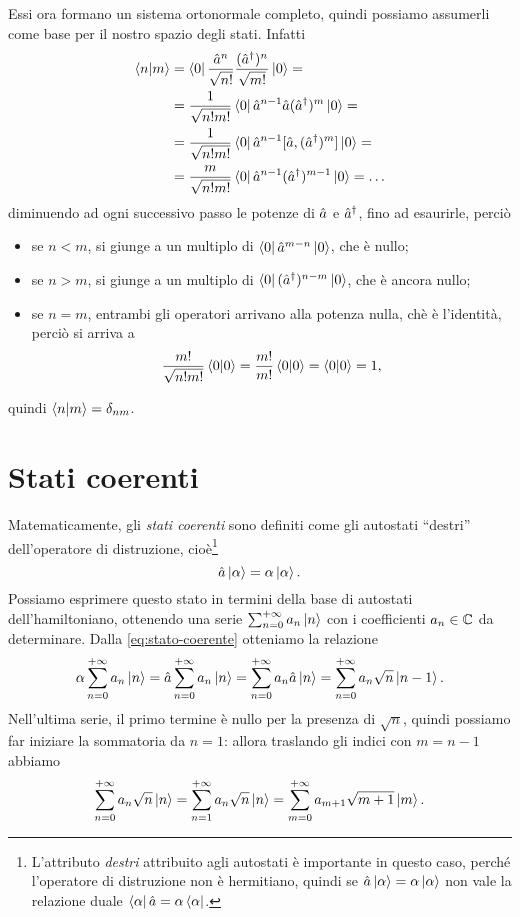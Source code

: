 Essi ora formano un sistema ortonormale completo, quindi possiamo assumerli come base per il nostro spazio degli stati.
Infatti
\begin{equation}
	\begin{split}
		\left\langle{n}\middle|{m}\right\rangle&=\left\langle{0}\right|\frac{\hat{a}^n}{\sqrt{n!}}\frac{({\hat{a}}^\dagger)^n}{\sqrt{m!}}\left|{0}\right\rangle=\\
		&=\frac1{\sqrt{n!m!}}\left\langle{0}\right|\hat{a}^{n-1}\hat{a}({\hat{a}}^\dagger)^m\left|{0}\right\rangle=\\
		&=\frac1{\sqrt{n!m!}}\left\langle{0}\right|\hat{a}^{n-1}[\hat{a},({\hat{a}}^\dagger)^m]\left|{0}\right\rangle=\\
		&=\frac{m}{\sqrt{n!m!}}\left\langle{0}\right|\hat{a}^{n-1}({\hat{a}}^\dagger)^{m-1}\left|{0}\right\rangle=\dots
	\end{split}
	\label{eq:oscillatore-armonico-ortonormalita-autostati}
\end{equation}
diminuendo ad ogni successivo passo le potenze di $\hat{a}$ e ${\hat{a}}^\dagger$, fino ad esaurirle, perciò
\begin{itemize}
	\item se $n<m$, si giunge a un multiplo di $\left\langle{0}\right|\hat{a}^{m-n}\left|{0}\right\rangle$, che è nullo;
	\item se $n>m$, si giunge a un multiplo di $\left\langle{0}\right|({\hat{a}}^\dagger)^{n-m}\left|{0}\right\rangle$, che è ancora nullo;
	\item se $n=m$, entrambi gli operatori arrivano alla potenza nulla, chè è l'identità, perciò si arriva a
		\begin{equation}
			\frac{m!}{\sqrt{n!m!}}\left\langle{0}\middle|{0}\right\rangle=\frac{m!}{m!}\left\langle{0}\middle|{0}\right\rangle=\left\langle{0}\middle|{0}\right\rangle=1,
		\end{equation}
\end{itemize}
quindi $\left\langle{n}\middle|{m}\right\rangle=\delta_{nm}$.

\section{Stati coerenti}
Matematicamente, gli \emph{stati coerenti} sono definiti come gli autostati ``destri'' dell'operatore di distruzione, cioè\footnote{L'attributo \emph{destri} attribuito agli autostati è importante in questo caso, perch\'e l'operatore di distruzione non è hermitiano, quindi se $\hat{a}\left|{\alpha}\right\rangle=\alpha\left|{\alpha}\right\rangle$ non vale la relazione duale $\left\langle{\alpha}\right|\hat{a}=\alpha\left\langle{\alpha}\right|$.}
\begin{equation}
	\hat{a}\left|{\alpha}\right\rangle=\alpha\left|{\alpha}\right\rangle.
	\label{eq:stato-coerente}
\end{equation}
Possiamo esprimere questo stato in termini della base di autostati dell'hamiltoniano, ottenendo una serie $\sum_{{n}=0}^{+\infty}a_n\left|{n}\right\rangle$ con i coefficienti $a_n\in\mathbb{C}$ da determinare.
Dalla \eqref{eq:stato-coerente} otteniamo la relazione
\begin{equation}
	\alpha\sum_{{n}=0}^{+\infty}a_n\left|{n}\right\rangle=\hat{a}\sum_{{n}=0}^{+\infty}a_n\left|{n}\right\rangle=\sum_{{n}=0}^{+\infty}a_n\hat{a}\left|{n}\right\rangle=\sum_{{n}=0}^{+\infty}a_n\sqrt{n}\left|{n-1}\right\rangle.
\end{equation}
Nell'ultima serie, il primo termine è nullo per la presenza di $\sqrt{n}$, quindi possiamo far iniziare la sommatoria da $n=1$: allora traslando gli indici con $m=n-1$ abbiamo
\begin{equation}
	\sum_{{n}=0}^{+\infty}a_n\sqrt{n}\left|{n}\right\rangle=\sum_{{n}=1}^{+\infty}a_n\sqrt{n}\left|{n}\right\rangle=\sum_{{m}=0}^{+\infty}a_{m+1}\sqrt{m+1}\left|{m}\right\rangle.
\end{equation}

